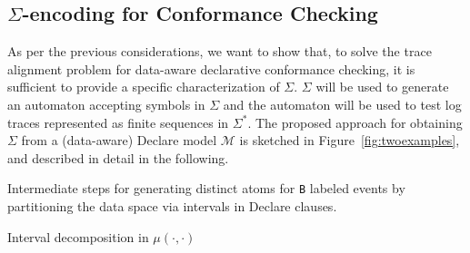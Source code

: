 \subsection{$\Sigma$-encoding for Conformance Checking}
\label{sec:dadtap}
As per the previous considerations, we want to show that, to solve the trace alignment problem for data-aware declarative conformance checking, it is sufficient to provide a specific characterization of $\Sigma$. $\Sigma$ will be used to generate an automaton accepting symbols in $\Sigma$ and the automaton will be used to test log traces represented as finite sequences in $\Sigma^*$. The proposed approach for obtaining $\Sigma$ from a (data-aware) Declare model $\mathcal{M}$ is sketched in Figure~\ref{fig:twoexamples}, and described in detail in the following.

\begin{table}[!t]
	\centering
	\captionsetup[subtable]{position = below}
	\captionsetup[table]{position=top}
	\caption{Intermediate steps for generating distinct atoms for \texttt{B} labeled events by partitioning the data space via intervals in Declare clauses.}
	\begin{subtable}{0.45\linewidth}
		\centering
		\caption{Interval decomposition in $\mu(\cdot, \cdot)$}
		\label{tab:dimFFT}
	\end{subtable}\quad
	\begin{subtable}{0.6\linewidth}
		\centering
		\caption{Atom generation for \texttt{B} by data space partitioning via $\times_{k\in K}\mu(\texttt{B},k)$}
		\label{tab:dimGMM}
	\end{subtable}
\end{table}

